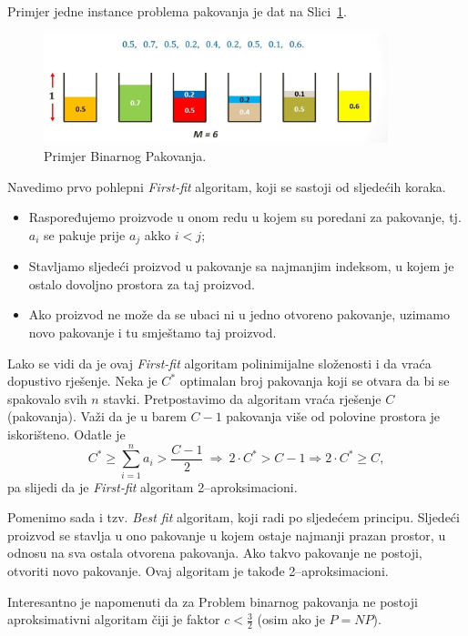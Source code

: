\documentclass[a4paper, utf8, 11pt, colorlinks]{book}
\theoremstyle{definition}
\begin{document}
  Primjer jedne instance problema pakovanja je dat na Slici~\ref{fig:bin-packing}.


\begin{figure}[H] 
	\centering
	\includegraphics[width=100mm]{maxresdefault.eps}%
	\caption{Primjer Binarnog Pakovanja.}
    \label{fig:bin-packing}
\end{figure}

Navedimo prvo pohlepni \emph{First-fit} algoritam, koji se sastoji od sljedećih koraka.
\begin{itemize}
	\item Raspoređujemo proizvode u onom redu u kojem su poredani za pakovanje, tj. $a_i$ se pakuje prije $a_j$ akko $i < j$;
	\item Stavljamo sljedeći proizvod u pakovanje sa najmanjim indeksom, u kojem je ostalo dovoljno prostora za taj proizvod.
	 \item Ako proizvod ne može da se ubaci ni u jedno otvoreno pakovanje, uzimamo novo pakovanje i tu smještamo taj proizvod.
\end{itemize}


Lako se vidi da je ovaj  \emph{First-fit} algoritam polinimijalne složenosti i da vraća dopustivo rješenje.  Neka je $C^*$ optimalan broj pakovanja koji se otvara da bi se spakovalo svih $n$ stavki. Pretpostavimo da algoritam vraća rješenje $C$ (pakovanja). Važi da je u barem $C-1$ pakovanja više od polovine prostora je iskorišteno. Odatle je
$$C^* \geq \sum_{i=1}^n a_i > \frac{C-1}{2}\ \Rightarrow\  2 \cdot C^* > C-1 \Rightarrow 2 \cdot C^* \geq C,$$
pa slijedi da je \emph{First-fit}  algoritam 2--aproksimacioni. 

Pomenimo sada i tzv. \emph{Best fit} algoritam, koji radi po sljedećem principu. Sljedeći proizvod se stavlja u ono pakovanje u kojem  ostaje najmanji prazan prostor, u odnosu na sva ostala otvorena pakovanja. Ako takvo pakovanje ne postoji, otvoriti novo pakovanje. 
Ovaj algoritam je takođe 2--aproksimacioni. 

Interesantno je napomenuti da za Problem binarnog pakovanja ne postoji aproksimativni algoritam čiji je faktor $c <\frac{3}{2}$ (osim ako je $P=NP$). 
\end{document}
